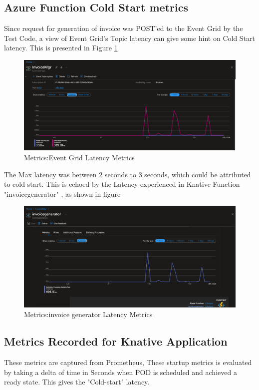 \documentclass{article}
\begin{document}
\begin{flushleft}
\subsection{Azure Function Cold Start metrics}
Since request for generation of invoice was POST'ed to the Event Grid by the Test Code, a view of Event Grid's Topic latency can give some hint on Cold Start latency. This is presented in Figure \ref{event_grid_latency_metrics}

\begin{figure}[h]
    \centering
    \includegraphics[scale=0.20]{images/AzurePerfCapture/eventgrid-topic-latency.PNG}
    \caption{Metrics:Event Grid Latency Metrics}
    \label{event_grid_latency_metrics}
\end{figure}
\par
The Max latency was between 2 seconds to 3 seconds, which could be attributed to cold start. This is echoed by the Latency experienced in Knative Function "invoicegenerator" , as shown in figure 
\begin{figure}[h]
    \centering
    \includegraphics[scale=0.20]{images/AzurePerfCapture/invoicegenerator-event-latency.PNG}
    \caption{Metrics:invoice generator Latency Metrics}
    \label{invoice-generator_latency_metrics}
\end{figure}
\par
\subsection{Metrics Recorded for Knative Application}
These metrics are captured from Prometheus, These startup metrics is evaluated by taking a delta of time in Seconds when \gls{POD} is scheduled and achieved a ready state. This gives the "Cold-start" latency.

\end{flushleft}
\end{document}
